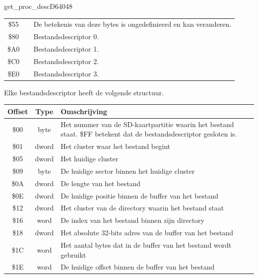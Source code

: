 \begin{hyppotrap}{get\_proc\_desc}{D640}{48}
{\begin{tabular}{|c|c|p{6.9cm}|}
  \$55 & & De betekenis van deze bytes is ongedefinieerd en kan veranderen.
  \\

  \$80 & & Bestandsdescriptor 0.
  \\

  \$A0 & & Bestandsdescriptor 1.
  \\

  \$C0 & & Bestandsdescriptor 2.
  \\

  \$E0 & & Bestandsdescriptor 3.
  \\\hline
  \end{tabular}
  }


  Elke bestandsdescriptor heeft de volgende structuur.  {\setlength{\tabcolsep}{2mm}
  \begin{tabular}{|c|c|p{6.9cm}|}
  \hline

  \textbf{Offset} & \textbf{Type} & \textbf{Omschrijving}
  \\\hline

  \$00 & byte  & Het nummer van de SD-kaartpartitie waarin het bestand staat.                 \$FF betekent dat de bestandsdescriptor gesloten is.
  \\\hline

  \$01 & dword & Het cluster waar het bestand begint
  \\\hline

  \$05 & dword & Het huidige cluster
  \\\hline

  \$09 & byte  & De huidige sector binnen het huidige cluster
  \\\hline

  \$0A & dword & De lengte van het bestand
  \\\hline

  \$0E & dword & De huidige positie binnen de buffer van het bestand
  \\\hline

  \$12 & dword & Het cluster van de directory waarin het bestand staat
  \\\hline

  \$16 & word  & De index van het bestand binnen zijn directory
  \\\hline

  \$18 & dword & Het absolute 32-bits adres van de buffer van het bestand
  \\\hline

  \$1C & word  & Het aantal bytes dat in de buffer van het bestand wordt gebruikt
  \\\hline

  \$1E & word  & De huidige offset binnen de buffer van het bestand
  \\\hline
  \end{tabular}
  }

\item [Foutcodes:]  
\item [Geschiedenis:]
\end{hyppotrap}


